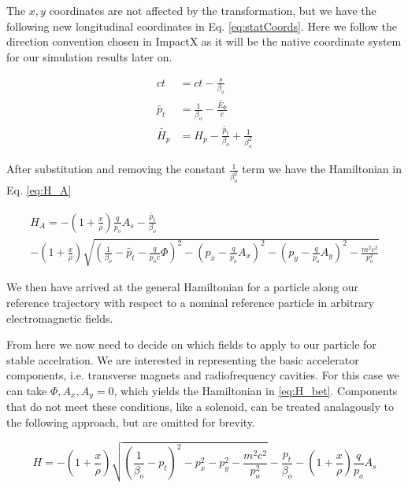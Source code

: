 The $x,y$ coordinates are not affected by the transformation, but we have the following new longitudinal coordinates in Eq. \ref{eq:statCoords}. Here we follow the direction convention chosen in ImpactX as it will be the native coordinate system for our simulation results later on.

\begin{equation} \label{eq:statCoords}
\begin{split}
	ct &= ct - \frac{s}{\beta_o}\\
	\tilde{p_t} &= \frac{1}{\beta_o} - \frac{\tilde{E_{\Phi}}}{c}\\
	\tilde{H_p} &= H_p - \frac{\tilde{p_t}}{\beta_o} + \frac{1}{\beta_o^2}
\end{split}
\end{equation}

After substitution and removing the constant $\frac{1}{\beta_o^2}$ term we have the Hamiltonian in Eq. \ref{eq:H_A}

\begin{multline} \label{eq:H_A}
	H_A = - \left(1 + \frac{x}{\rho}\right)\frac{q}{p_o}A_s - \frac{\tilde{p_t}}{\beta_o}\\
	-\left(1 + \frac{x}{\rho}\right)\sqrt{\left(\frac{1}{\beta_o} - \tilde{p_t}  - \frac{q}{p_o c}\Phi\right)^2 - \left(p_x -\frac{q}{p_o} A_x\right)^2 - \left(p_y - \frac{q}{p_o} A_y\right)^2 - \frac{m^2c^2}{p_o^2}}
\end{multline}

We then have arrived at the general Hamiltonian for a particle along our reference trajectory with respect to a nominal reference particle in arbitrary electromagnetic fields. 

From here we now need to decide on which fields to apply to our particle for stable accelration. We are interested in representing the basic accelerator components, i.e. transverse magnets and radiofrequency cavities. For this case we can take $\Phi, A_x, A_y = 0$, which yields the Hamiltonian in \ref{eq:H_bet}. Components that do not meet these conditions, like a solenoid, can be treated analagously to the following approach, but are omitted for brevity.

\begin{equation} \label{eq:H_bet}
	H = -\left(1 + \frac{x}{\rho}\right)\sqrt{\left(\frac{1}{\beta_o} - p_t \right)^2 - p_x^2 - p_y^2- \frac{m^2c^2}{p_o^2}} - \frac{p_t}{\beta_o} - \left(1 + \frac{x}{\rho}\right)\frac{q}{p_o}A_s
\end{equation}

